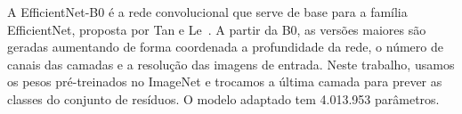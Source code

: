 A EfficientNet-B0 é a rede convolucional que serve de base para a família EfficientNet, proposta por Tan e Le~\cite{tan2019efficientnet}.
A partir da B0, as versões maiores são geradas aumentando de forma coordenada a profundidade da rede, o número de canais das camadas e a resolução das imagens de entrada.
Neste trabalho, usamos os pesos pré-treinados no ImageNet e trocamos a última camada para prever as classes do conjunto de resíduos.
O modelo adaptado tem 4.013.953 parâmetros.
